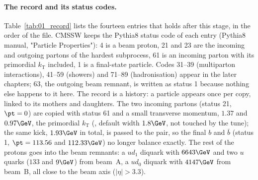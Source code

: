 \paragraph{The record and its status codes.} Table~\ref{tab:01_record} lists the fourteen entries that
 holds after this stage, in the order of the file. CMSSW keeps the Pythia8 status
code of each entry (Pythia8 manual, "Particle Properties"): 4 is a beam proton, 21 and 23 are the
incoming and outgoing partons of the hardest subprocess, 61 is an incoming parton with its primordial
$k_{\mathrm T}$ included, 1 is a final-state particle. Codes 31--39 (multiparton interactions), 41--59
(showers) and 71--89 (hadronisation) appear in the later chapters; 63, the outgoing beam remnant, is
written as status 1 because nothing else happens to it here. The record is a history: a particle appears
once per copy, linked to its mothers and daughters. The two incoming partons (status 21, $\pt = 0$) are
copied with status 61 and a small transverse momentum, $1.37$ and $0.97\GeV$, the primordial
$k_{\mathrm T}$ (, default width $1.8\GeV$, not touched by the tune);
the same kick, $1.93\GeV$ in total, is passed to the \bbbar{} pair, so the final $b$ and $\bar b$
(status 1, $\pt = 113.56$ and $112.33\GeV$) no longer balance exactly. The rest of the protons goes into
the beam remnants: a $ud_1$ diquark with $6643\GeV$ and two $u$ quarks ($133$ and $9\GeV$) from beam~A, a
$ud_0$ diquark with $4147\GeV$ from beam~B, all close to the beam axis ($|\eta| > 3.3$).

